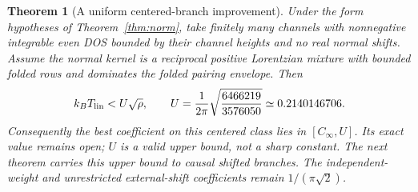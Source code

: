 \documentclass[11pt]{article}
\newtheorem{theorem}{Theorem}
\newcommand{\Cinf}{C_\infty}
\newcommand{\Tlin}{T_{\rm lin}}
\begin{document}
\begin{theorem}[A uniform centered-branch improvement]\label{thm:centered-gap}
Under the form hypotheses of Theorem~\ref{thm:norm}, take finitely many channels with nonnegative integrable even DOS bounded by their channel heights and no real normal shifts. Assume the normal kernel is a reciprocal positive Lorentzian mixture with bounded folded rows and dominates the folded pairing envelope. Then
\[
 k_B\Tlin<U\sqrt\rho,
 \qquad U=\frac1{2\pi}\sqrt{\frac{6466219}{3576050}}\simeq0.2140146706.
\]
Consequently the best coefficient on this centered class lies in $[\Cinf,U]$. Its exact value remains open; $U$ is a valid upper bound, not a sharp constant. The next theorem carries this upper bound to causal shifted branches. The independent-weight and unrestricted external-shift coefficients remain $1/(\pi\sqrt2)$.
\end{theorem}
\end{document}
